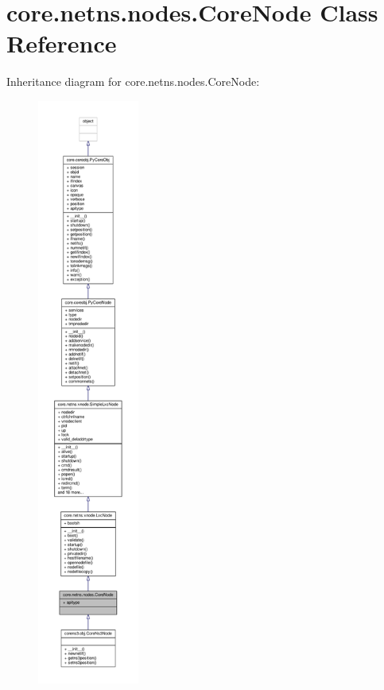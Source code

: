 \hypertarget{classcore_1_1netns_1_1nodes_1_1_core_node}{\section{core.\+netns.\+nodes.\+Core\+Node Class Reference}
\label{classcore_1_1netns_1_1nodes_1_1_core_node}
}


Inheritance diagram for core.\+netns.\+nodes.\+Core\+Node\+:
\nopagebreak
\begin{figure}[H]
\begin{center}
\leavevmode
\includegraphics[height=550pt]{classcore_1_1netns_1_1nodes_1_1_core_node__inherit__graph}
\end{center}
\end{figure}


